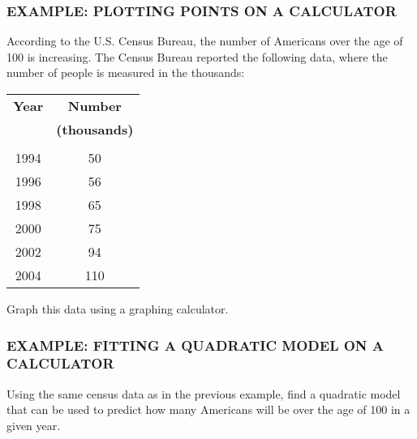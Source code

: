 \documentclass[8pt]{beamer}
\newcommand{\extitle}[1]{\frametitle{\fontfamily{fvs}\selectfont \small\color{black!70!blue!80!cyan}\uppercase{\bfseries Example: #1}}}
\newenvironment{exsol}
{
\begin{tcolorbox}[colframe=black!50!blue!50!cyan,
colback=white,
bottomrule=0mm,
rightrule=0mm,
sharp corners=all] 

}
{ \end{tcolorbox}}
\begin{document}
\begin{frame}
\extitle{Plotting Points on a Calculator}
According to the U.S. Census Bureau, the number of Americans over the age of 100 is increasing.  The Census Bureau reported the following data, where the number of people is measured in the thousands:
\begin{center}
\begin{tabular}{c c}
\textbf{Year} & \textbf{Number}\\
& \textbf{(thousands)}\\
\hline
& \\
1994 & 50\\
1996 & 56\\
1998 & 65\\
2000 & 75\\
2002 & 94\\
2004 & 110
\end{tabular}
\end{center}

Graph this data using a graphing calculator.

\begin{exsol}
\vspace{3in}
\text{}
\end{exsol}
\end{frame}

\begin{frame}
\extitle{Fitting a Quadratic Model on a Calculator}
Using the same census data as in the previous example, find a quadratic model that can be used to predict how many Americans will be over the age of 100 in a given year.

\begin{exsol}
\vspace{3in}
\text{}
\end{exsol}
\end{frame}
\end{document}
